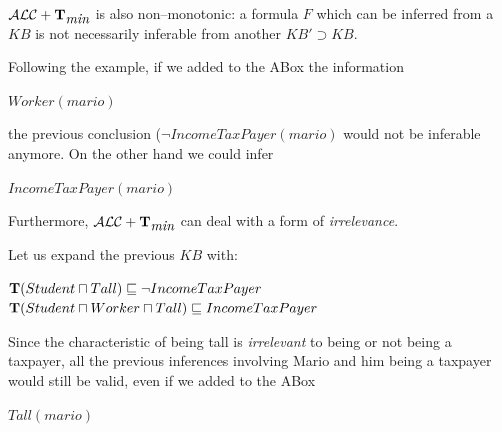 \documentclass[a4paper, 11pt, oneside]{duthesis}
\newcommand{\tip}{{\bf T}}
\newcommand{\alctmin}{\mathcal{ALC}+\tip_{\mbox{\em min}}}
\begin{document}
$\alctmin$ is also non--monotonic: a formula $F$ which can be inferred from a $KB$ is not necessarily inferable from another $KB' \supset KB$.

Following the example, if we added to the ABox the information
\begin{center}$Worker(mario)$\end{center}
the previous conclusion ($\neg IncomeTaxPayer(mario)$ would not be inferable anymore. On the other hand we could infer
\begin{center}$IncomeTaxPayer(mario)$\end{center}

Furthermore, $\alctmin$ can deal with a form of \emph{irrelevance}.

Let us expand the previous $KB$ with:
\begin{center}
$\tip(Student \sqcap Tall) \sqsubseteq \neg IncomeTaxPayer$\\
$\tip(Student \sqcap Worker \sqcap Tall) \sqsubseteq IncomeTaxPayer$
\end{center}
Since the characteristic of being tall is \emph{irrelevant} to being or not being a taxpayer, all the previous inferences involving Mario and him being a taxpayer would still be valid, even if we added to the ABox
\begin{center}
$Tall(mario)$
\end{center}

\newpage


\end{document}
